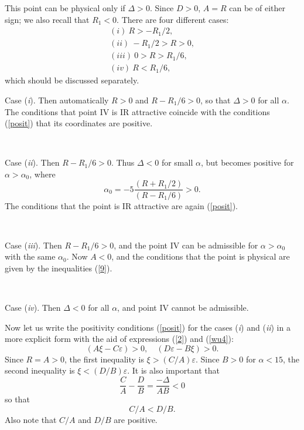 \documentclass[12pt]{iopart}
\begin{document}
This point can be physical only if $\Delta>0$. Since $D>0$, $A=R$ can be of
either sign; we also recall that $R_{1}<0$. There are four different cases:
\begin{eqnarray}
(i)\ R>-R_{1}/2,
\nonumber \\
(ii)\ -R_{1}/2 >R >0,
\nonumber \\
(iii)\ 0>R >R_{1}/6 ,
\nonumber \\
(iv)\ R<R_{1}/6,
\label{casesR}
\end{eqnarray}
which should be discussed separately.

Case ({\it i}). Then automatically $R>0$ and $R-R_{1}/6>0$, so that
$\Delta>0$ for all $\alpha$.
The conditions that point IV is IR attractive coincide with the
conditions (\ref{posit}) that its coordinates are positive.

\

Case ({\it ii}). Then $R-R_{1}/6>0$. Thus $\Delta<0$ for small
$\alpha$, but becomes positive for $\alpha>\alpha_{0}$, where
\begin{equation}
\alpha_{0} = -5 \frac{(R+R_{1}/2)} {(R-R_{1}/6)} >0.
\label{Alo}
\end{equation}
The conditions that the point is IR attractive are again (\ref{posit}).

\



Case ({\it iii}). Then $R-R_{1}/6>0$, and the point IV can be
admissible for $\alpha>\alpha_{0}$ with the same $\alpha_{0}$. Now $A<0$,
and the conditions that the point is physical are given by the inequalities
(\ref{9}).


\


Case ({\it iv}). Then $\Delta<0$ for all $\alpha$, and point IV cannot
be admissible.



Now let us write the positivity conditions (\ref{posit}) for the cases
({\it i}) and ({\it ii}) in a more explicit form with the aid of
expressions (\ref{2}) and (\ref{wu4}):
\begin{equation}
(A\xi - C\varepsilon )>0 , \quad  (D\varepsilon - B\xi )>0.
\label{Stab}
\end{equation}
Since $R=A>0$, the first inequality is $\xi> (C/A)\varepsilon$.
Since $B>0$ for $\alpha<15$, the second inequality is $\xi< (D/B)\varepsilon$.
It is also important that
\begin{equation}
\frac{C}{A}-\frac{D}{B}= \frac{-\Delta}{AB}<0
\label{St}
\end{equation}
so that
\[ {C}/{A}<{D}/{B}. \]
Also note that $C/A$ and $D/B$ are positive.
\end{document}
